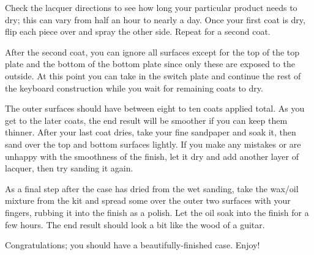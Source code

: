 \documentclass{article}
\begin{document}
Check the lacquer directions to see how long your particular product
needs to dry; this can vary from half an hour to nearly a day. Once
your first coat is dry, flip each piece over and spray the other
side. Repeat for a second coat.

After the second coat, you can ignore all surfaces except for the top
of the top plate and the bottom of the bottom plate since only these
are exposed to the outside. At this point you can take in the switch
plate and continue the rest of the keyboard construction while you
wait for remaining coats to dry.

The outer surfaces should have between eight to ten coats applied total. As
you get to the later coats, the end result will be smoother if you can
keep them thinner. After your last coat dries, take your fine
sandpaper and soak it, then sand over the top and bottom surfaces
lightly. If you make any mistakes or are unhappy with the smoothness
of the finish, let it dry and add another layer of lacquer, then try
sanding it again.

As a final step after the case has dried from the wet sanding, take
the wax/oil mixture from the kit and spread some over the outer two
surfaces with your fingers, rubbing it into the finish as a
polish. Let the oil soak into the finish for a few hours. The end
result should look a bit like the wood of a guitar.

Congratulations; you should have a beautifully-finished case. Enjoy!
\end{document}
